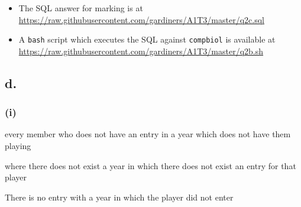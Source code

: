 \documentclass{article}
\begin{document}
\begin{itemize}
    \item The SQL answer for marking is at \url{https://raw.githubusercontent.com/gardiners/A1T3/master/q2c.sql}
    \item A \texttt{bash} script which executes the SQL against \texttt{compbiol} is available at  \url{https://raw.githubusercontent.com/gardiners/A1T3/master/q2b.sh}
\end{itemize}

\subsection{d.}

\subsubsection{(i)}

every member who does not have an entry in a  year which does not have them playing

where there does not exist a year in which there does not exist an entry for that player

There is no entry with a year in which the player did not enter
\end{document}
